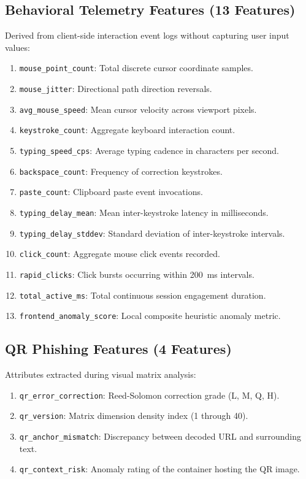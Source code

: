 \documentclass[conference]{IEEEtran}
\begin{document}
\subsection{Behavioral Telemetry Features (13 Features)}
Derived from client-side interaction event logs without capturing user input values:
\begin{enumerate}[leftmargin=*,nosep]
\item \texttt{mouse\_point\_count}: Total discrete cursor coordinate samples.
\item \texttt{mouse\_jitter}: Directional path direction reversals.
\item \texttt{avg\_mouse\_speed}: Mean cursor velocity across viewport pixels.
\item \texttt{keystroke\_count}: Aggregate keyboard interaction count.
\item \texttt{typing\_speed\_cps}: Average typing cadence in characters per second.
\item \texttt{backspace\_count}: Frequency of correction keystrokes.
\item \texttt{paste\_count}: Clipboard paste event invocations.
\item \texttt{typing\_delay\_mean}: Mean inter-keystroke latency in milliseconds.
\item \texttt{typing\_delay\_stddev}: Standard deviation of inter-keystroke intervals.
\item \texttt{click\_count}: Aggregate mouse click events recorded.
\item \texttt{rapid\_clicks}: Click bursts occurring within 200~ms intervals.
\item \texttt{total\_active\_ms}: Total continuous session engagement duration.
\item \texttt{frontend\_anomaly\_score}: Local composite heuristic anomaly metric.
\end{enumerate}

\subsection{QR Phishing Features (4 Features)}
Attributes extracted during visual matrix analysis:
\begin{enumerate}[leftmargin=*,nosep]
\item \texttt{qr\_error\_correction}: Reed-Solomon correction grade (L, M, Q, H).
\item \texttt{qr\_version}: Matrix dimension density index (1 through 40).
\item \texttt{qr\_anchor\_mismatch}: Discrepancy between decoded URL and surrounding text.
\item \texttt{qr\_context\_risk}: Anomaly rating of the container hosting the QR image.
\end{enumerate}
\end{document}
